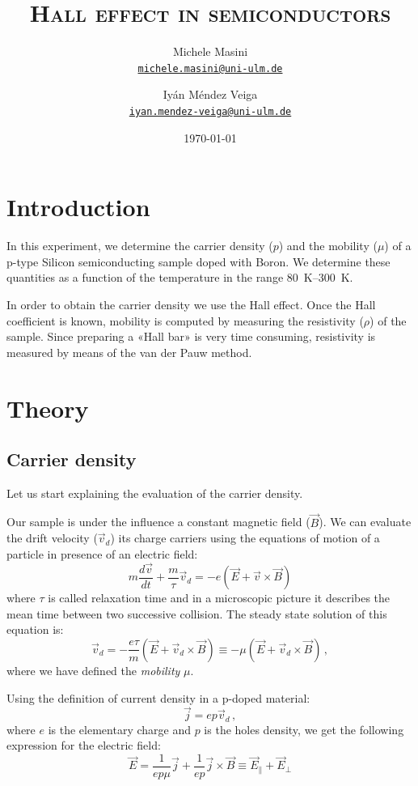 \documentclass[11pt,a4paper]{article}
\title{\bfseries\textsc{Hall effect in semiconductors}}
\author{
Michele Masini\\ \small\texttt{\href{mailto:michele.masini@uni-ulm.de}{michele.masini@uni-ulm.de}}\and
Iyán Méndez Veiga\\ \small\texttt{\href{mailto:iyan.mendez-veiga@uni-ulm.de}{iyan.mendez-veiga@uni-ulm.de}}
}
\date{\today}
\begin{document}
\maketitle

\section{Introduction}
In this experiment, we determine the carrier density ($p$) and the mobility ($\mu$) of a p-type Silicon semiconducting sample doped with Boron. We determine these quantities as a function of the temperature in the range \SIrange{80}{300}{\kelvin}.

In order to obtain the carrier density we use the Hall effect. Once the Hall coefficient is known, mobility is computed by measuring the resistivity ($\rho$) of the sample. Since preparing a «Hall bar» is very time consuming, resistivity is measured by means of the van der Pauw method.

\section{Theory}

\subsection{Carrier density}
Let us start explaining the evaluation of the carrier density.

Our sample is under the influence a constant magnetic field ($\vec{B}$). We can evaluate the drift velocity ($\vec{v}_d$) its charge carriers using the equations of motion of a particle in presence of an electric field:
\begin{equation*}
m\frac{d\vec{v}}{dt}+\frac{m}{\tau}\vec{v}_d=-e(\vec{E}+\vec{v}\times\vec{B})
\end{equation*}
where $\tau$ is called relaxation time and in a microscopic picture it describes the mean time between two successive collision. The steady state solution of this equation is: 
\begin{equation*}
\vec{v}_d=-\frac{e\tau}{m}(\vec{E}+\vec{v}_d\times\vec{B})\equiv -\mu (\vec{E}+\vec{v}_d\times\vec{B})\,,
\end{equation*}
where we have defined the \emph{mobility} $\mu$.

Using the definition of current density in a p-doped material:
\begin{equation*}
\vec{j}=ep\vec{v}_d\,,
\end{equation*}
where $e$ is the elementary charge and $p$ is the holes density, we get the following expression for the electric field:
\begin{equation*}
\vec{E}=\frac{1}{ep\mu}\vec{j}+\frac{1}{ep}\vec{j}\times\vec{B}\equiv \vec{E}_\parallel+\vec{E}_\perp
\end{equation*}
\end{document}
